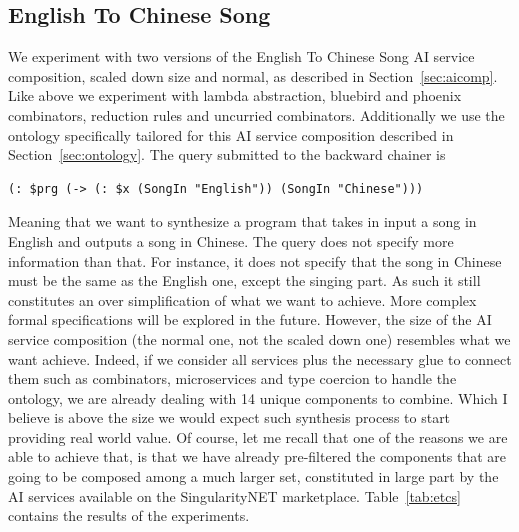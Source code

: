 \documentclass[]{report}
\begin{document}
\subsection{English To Chinese Song}
\label{sec:etcs}
We experiment with two versions of the English To Chinese Song AI
service composition, scaled down size and normal, as described in
Section~\ref{sec:aicomp}.  Like above we experiment with lambda
abstraction, bluebird and phoenix combinators, reduction rules and
uncurried combinators.  Additionally we use the ontology specifically
tailored for this AI service composition described in
Section~\ref{sec:ontology}.  The query submitted to the backward
chainer is
\begin{verbatim}
(: $prg (-> (: $x (SongIn "English")) (SongIn "Chinese")))
\end{verbatim}
Meaning that we want to synthesize a program that takes in input a
song in English and outputs a song in Chinese.  The query does not
specify more information than that.  For instance, it does not specify
that the song in Chinese must be the same as the English one, except
the singing part.  As such it still constitutes an over simplification
of what we want to achieve.  More complex formal specifications will
be explored in the future.  However, the size of the AI service
composition (the normal one, not the scaled down one) resembles what
we want achieve.  Indeed, if we consider all services plus the
necessary glue to connect them such as combinators, microservices and
type coercion to handle the ontology, we are already dealing with 14
unique components to combine.  Which I believe is above the size we
would expect such synthesis process to start providing real world
value.  Of course, let me recall that one of the reasons we are able
to achieve that, is that we have already pre-filtered the components
that are going to be composed among a much larger set, constituted in
large part by the AI services available on the SingularityNET
marketplace.  Table~\ref{tab:etcs} contains the results of the
experiments.
\end{document}
